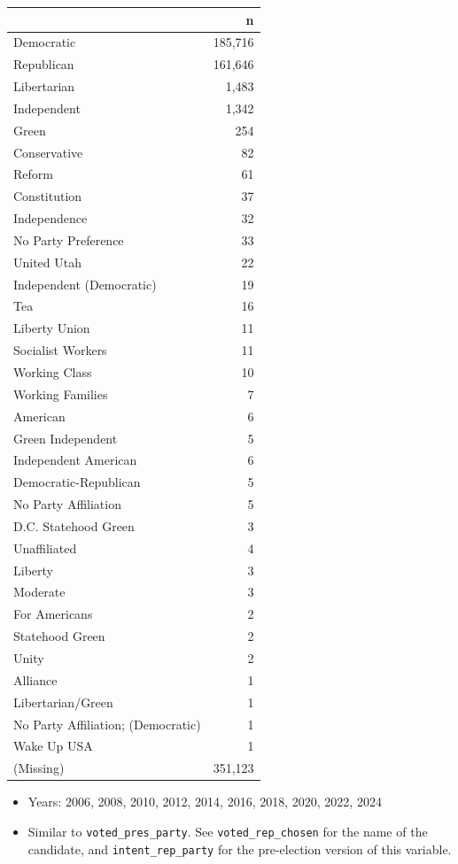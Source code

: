 \documentclass[10pt,article,oneside]{memoir}
\begin{document}
\begin{table}[H]
\centering
\begin{tabular}[t]{lr}
\toprule
 & n\\
\midrule
Democratic & 185,716\\
Republican & 161,646\\
Libertarian & 1,483\\
Independent & 1,342\\
Green & 254\\
Conservative & 82\\
Reform & 61\\
Constitution & 37\\
Independence & 32\\
No Party Preference & 33\\
United Utah & 22\\
Independent (Democratic) & 19\\
Tea & 16\\
Liberty Union & 11\\
Socialist Workers & 11\\
Working Class & 10\\
Working Families & 7\\
American & 6\\
Green Independent & 5\\
Independent American & 6\\
Democratic-Republican & 5\\
No Party Affiliation & 5\\
D.C. Statehood Green & 3\\
Unaffiliated & 4\\
Liberty & 3\\
Moderate & 3\\
For Americans & 2\\
Statehood Green & 2\\
Unity & 2\\
Alliance & 1\\
Libertarian/Green & 1\\
No Party Affiliation; (Democratic) & 1\\
Wake Up USA & 1\\
(Missing) & 351,123\\
\bottomrule
\end{tabular}
\end{table}

\begin{itemize}
\tightlist
\item
  Years: 2006, 2008, 2010, 2012, 2014, 2016, 2018, 2020, 2022, 2024
\item
  Similar to \texttt{voted\_pres\_party}. See
  \texttt{voted\_rep\_chosen} for the name of the candidate, and
  \texttt{intent\_rep\_party} for the pre-election version of this
  variable.
\end{itemize}
\end{document}
